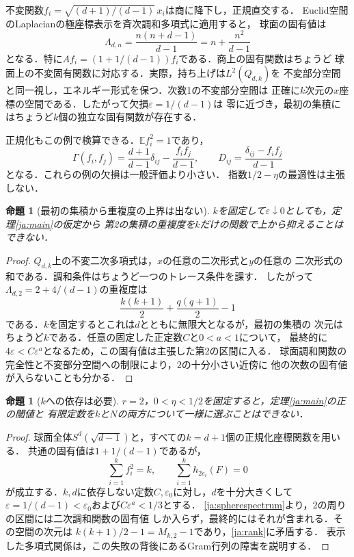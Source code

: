 \documentclass[12pt]{amsart}
\theoremstyle{definition}
\theoremstyle{remark}
\numberwithin{equation}{section}
\newcommand{\E}{\mathbb E}
\newcommand{\eps}{\varepsilon}
\theoremstyle{plain}
\newtheorem{japrop}[thm]{命題}
\begin{document}
不変関数$f_i=\sqrt{(d+1)/(d-1)}\,x_i$は商に降下し，正規直交する．
Euclid空間のLaplacianの極座標表示を斉次調和多項式に適用すると，
球面の固有値は
\begin{equation}\label{ja:spherespectrum}
 \Lambda_{d,n}=\frac{n(n+d-1)}{d-1}=n+\frac{n^2}{d-1}
\end{equation}
となる．特に$Af_i=(1+1/(d-1))f_i$である．商上の固有関数はちょうど
球面上の不変固有関数に対応する．実際，持ち上げは$L^2(Q_{d,k})$を
不変部分空間と同一視し，エネルギー形式を保つ．次数1の不変部分空間は
正確に$k$次元の$x$座標の空間である．したがって欠損$\eps=1/(d-1)$は
零に近づき，最初の集積にはちょうど$k$個の独立な固有関数が存在する．

正規化もこの例で検算できる．$\E f_i^2=1$であり，
\[
 \Gamma(f_i,f_j)=\frac{d+1}{d-1}\delta_{ij}
                    -\frac{f_if_j}{d-1},\qquad
 D_{ij}=\frac{\delta_{ij}-f_if_j}{d-1}
\]
となる．これらの例の欠損は一般評価より小さい．
指数$1/2-\eta$の最適性は主張しない．

\begin{japrop}[最初の集積から重複度の上界は出ない]\label{ja:noupper}
$k$を固定して$\eps\downarrow0$としても，定理\ref{ja:main}の仮定から
第2の集積の重複度を$k$だけの関数で上から抑えることはできない．
\end{japrop}
\begin{proof}
$Q_{d,k}$上の不変二次多項式は，$x$の任意の二次形式と$y$の任意の
二次形式の和である．調和条件はちょうど一つのトレース条件を課す．
したがって$\Lambda_{d,2}=2+4/(d-1)$の重複度は
\[
 \frac{k(k+1)}2+\frac{q(q+1)}2-1
\]
である．$k$を固定するとこれは$d$とともに無限大となるが，最初の集積の
次元はちょうど$k$である．任意の固定した正定数$C$と$0<a<1$について，
最終的に$4\eps<C\eps^a$となるため，この固有値は主張した第2の区間に入る．
球面調和関数の完全性と不変部分空間への制限により，$2$の十分小さい近傍に
他の次数の固有値が入らないことも分かる．
\end{proof}

\begin{japrop}[$k$への依存は必要]\label{ja:knecessary}
$r=2$，$0<\eta<1/2$を固定すると，定理\ref{ja:main}の正の閾値と
有限定数を$k$と$N$の両方について一様に選ぶことはできない．
\end{japrop}
\begin{proof}
球面全体$S^d(\sqrt{d-1})$と，すべての$k=d+1$個の正規化座標関数を用いる．
共通の固有値は$1+1/(d-1)$であるが，
\[
 \sum_{i=1}^k f_i^2=k,\qquad
 \sum_{i=1}^k h_{2e_i}(F)=0
\]
が成立する．$k,d$に依存しない定数$C,\eps_0$に対し，$d$を十分大きくして
$\eps=1/(d-1)<\eps_0$および$C\eps^a<1/3$とする．
\eqref{ja:spherespectrum}より，$2$の周りの区間には二次調和関数の固有値
しか入らず，最終的にはそれが含まれる．その空間の次元は
$k(k+1)/2-1=M_{k,2}-1$であり，\eqref{ja:rank}に矛盾する．
表示した多項式関係は，この失敗の背後にあるGram行列の障害を説明する．
\end{proof}
\end{document}
